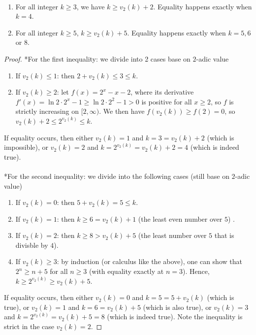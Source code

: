 \documentclass{treatise}
\begin{document}
\begin{lemma} \label{even-val-ineq} \ 
\begin{enumerate}
	\item For all integer $k \geq 3$, we have $k \geq v_2 (k) + 2$. Equality happens exactly when $k = 4$.
	\item For all integer $k \geq 5$, $k \geq v_2(k) + 5$. Equality happens exactly when $k = 5, 6$ or $8$.
\end{enumerate}
\end{lemma}
\begin{proof}
*For the first inequality: we divide into 2 cases base on $2$-adic value
\begin{enumerate}
	\item If $v_2 (k) \leq 1$: then $2 + v_2 (k) \leq 3 \leq k$.
	\item If $v_2 (k) \geq 2$: let $f(x) = 2^x - x - 2$, where its derivative $f'(x) = \ln 2 \cdot 2^x - 1 \geq \ln 2 \cdot 2^2 - 1 > 0$ is positive for all $x \geq 2$, so $f$ is strictly increasing on $[2, \infty)$. We then have $f(v_2(k)) \geq f(2) = 0$, so $v_2 (k) + 2 \leq 2^{v_2 (k)} \leq k$.
\end{enumerate}
If equality occurs, then either $v_2 (k) = 1$ and $k = 3 = v_2(k) + 2$ (which is impossible), or $v_2 (k) = 2$ and $k = 2^{v_2(k)} = v_2 (k) + 2 = 4$ (which is indeed true).
\\
\\
*For the second inequality: we divide into the following cases (still base on $2$-adic value)
\begin{enumerate}
	\item If $v_2 (k) = 0$: then $5 + v_2 (k) = 5 \leq k$.
	\item If $v_2 (k) = 1$: then $k \geq 6 = v_2 (k) + 1$ (the least even number over $5$) .
	\item If $v_2 (k) = 2$: then $k \geq 8 > v_2 (k) + 5$ (the least number over $5$ that is divisble by $4$).
	\item If $v_2 (k) \geq 3$: by induction (or calculus like the above), one can show that $2^n \geq n + 5$ for all $n \geq 3$ (with equality exactly at $n = 3$). Hence, $k \geq 2^{v_2 (k)} \geq v_2 (k) + 5$.
\end{enumerate}
If equality occurs, then either $v_2 (k) = 0$ and $k = 5 = 5 + v_2(k)$ (which is true), or $v_2 (k) = 1$ and $k = 6 = v_2 (k) + 5$ (which is also true), or $v_2 (k) = 3$ and $k = 2^{v_2 (k)} = v_2 (k) + 5 = 8$ (which is indeed true). Note the inequality is strict in the case $v_2 (k) = 2$.
\end{proof}
\end{document}
